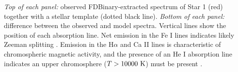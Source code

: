 \label{fig:emission1} \emph{Top of each panel:} observed FDBinary-extracted spectrum of Star 1 (red) together with a stellar template (dotted black line). \emph{Bottom of each panel:} difference between the observed and model spectra. Vertical lines show the position of each absorption line. Net emission in the Fe I lines indicates likely Zeeman splitting \citep{har73}. Emission in the H$\alpha$ and Ca II lines is characteristic of chromospheric magnetic activity, and the presence of an He I absorption line indicates an upper chromosphere ($T > 10000 \ \rm{K}$) must be present \citep{fro12}.
  
  
  
  
  